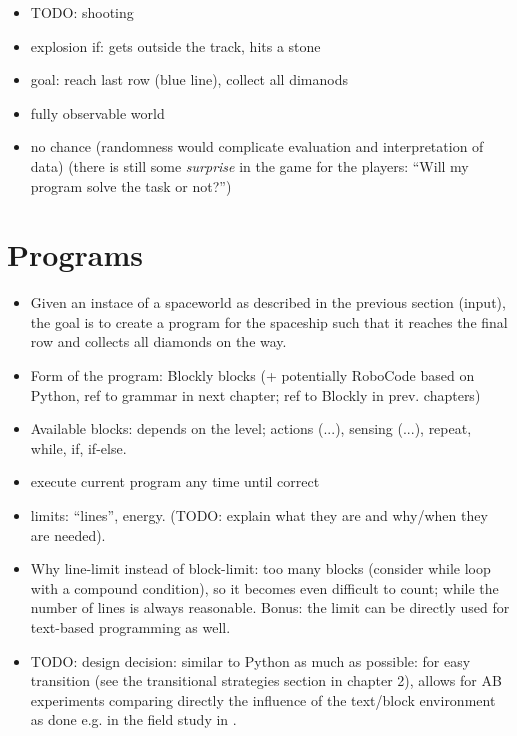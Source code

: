 \begin{itemize}
\item TODO: shooting
\item explosion if: gets outside the track, hits a stone
\item goal: reach last row (blue line), collect all dimanods
\item fully observable world
\item no chance (randomness would complicate evaluation and interpretation
  of data) (there is still some \emph{surprise} in the game for the players:
  ``Will my program solve the task or not?'')
\end{itemize}





\section{Programs}
\label{sec:robomission.programs}

\begin{itemize}
\item Given an instace of a spaceworld as described in the previous section
(input), the goal is to create a program for the spaceship such that it reaches
the final row and collects all diamonds on the way.
\item Form of the program: Blockly blocks (+ potentially RoboCode based on
Python, ref to grammar in next chapter; ref to Blockly in prev. chapters)
\item Available blocks: depends on the level;
  actions (...), sensing (...), repeat, while, if, if-else.
\item execute current program any time until correct
\item limits: ``lines'', energy.
  (TODO: explain what they are and why/when they are needed).
\item Why line-limit instead of block-limit: too many blocks (consider while
  loop with a compound condition), so it becomes even difficult to count;
  while the number of lines is always reasonable.
  Bonus: the limit can be directly used for text-based programming as well.
\item TODO: design decision: similar to Python as much as possible: for easy transition
(see the transitional strategies section in chapter 2), allows for AB experiments
comparing directly the influence of the text/block environment as done e.g.
in the field study in \cite{comparing-blocks-text-weintrop2017}.
\end{itemize}


